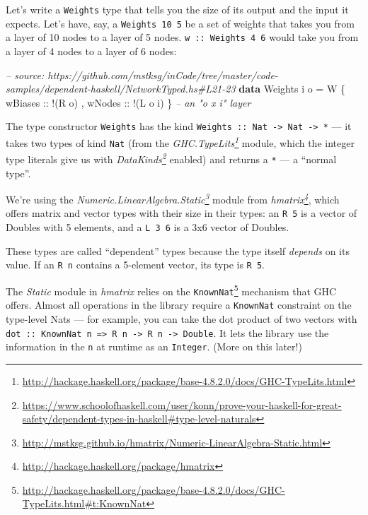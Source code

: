 \documentclass[]{article}
\newenvironment{Shaded}{\begin{snugshade}}{\end{snugshade}}
\newcommand{\CommentTok}[1]{\textcolor[rgb]{0.56,0.35,0.01}{\textit{#1}}}
\newcommand{\DataTypeTok}[1]{\textcolor[rgb]{0.13,0.29,0.53}{#1}}
\newcommand{\FunctionTok}[1]{\textcolor[rgb]{0.00,0.00,0.00}{#1}}
\newcommand{\KeywordTok}[1]{\textcolor[rgb]{0.13,0.29,0.53}{\textbf{#1}}}
\newcommand{\NormalTok}[1]{#1}
\newcommand{\OtherTok}[1]{\textcolor[rgb]{0.56,0.35,0.01}{#1}}
\renewcommand{\href}[2]{#2\footnote{\url{#1}}}
\begin{document}
Let's write a \texttt{Weights} type that tells you the size of its output and
the input it expects. Let's have, say, a \texttt{Weights\ 10\ 5} be a set of
weights that takes you from a layer of 10 nodes to a layer of 5 nodes.
\texttt{w\ ::\ Weights\ 4\ 6} would take you from a layer of 4 nodes to a layer
of 6 nodes:

\begin{Shaded}
\begin{Highlighting}[]
\CommentTok{-- source: https://github.com/mstksg/inCode/tree/master/code-samples/dependent-haskell/NetworkTyped.hs#L21-23}
\KeywordTok{data} \DataTypeTok{Weights}\NormalTok{ i o }\FunctionTok{=} \DataTypeTok{W}\NormalTok{ \{}\OtherTok{ wBiases ::} \FunctionTok{!}\NormalTok{(}\DataTypeTok{R}\NormalTok{ o)}
\NormalTok{                     ,}\OtherTok{ wNodes  ::} \FunctionTok{!}\NormalTok{(}\DataTypeTok{L}\NormalTok{ o i)}
\NormalTok{                     \}                      }\CommentTok{-- an "o x i" layer}
\end{Highlighting}
\end{Shaded}

The type constructor \texttt{Weights} has the kind
\texttt{Weights\ ::\ Nat\ -\textgreater{}\ Nat\ -\textgreater{}\ *} --- it takes
two types of kind \texttt{Nat} (from the
\emph{\href{http://hackage.haskell.org/package/base-4.8.2.0/docs/GHC-TypeLits.html}{GHC.TypeLits}}
module, which the integer type literals give us with
\emph{\href{https://www.schoolofhaskell.com/user/konn/prove-your-haskell-for-great-safety/dependent-types-in-haskell\#type-level-naturals}{DataKinds}}
enabled) and returns a \texttt{*} --- a ``normal type''.

We're using the
\emph{\href{http://mstksg.github.io/hmatrix/Numeric-LinearAlgebra-Static.html}{Numeric.LinearAlgebra.Static}}
module from \emph{\href{http://hackage.haskell.org/package/hmatrix}{hmatrix}},
which offers matrix and vector types with their size in their types: an
\texttt{R\ 5} is a vector of Doubles with 5 elements, and a \texttt{L\ 3\ 6} is
a 3x6 vector of Doubles.

These types are called ``dependent'' types because the type itself
\emph{depends} on its value. If an \texttt{R\ n} contains a 5-element vector,
its type is \texttt{R\ 5}.

The \emph{Static} module in \emph{hmatrix} relies on the
\href{http://hackage.haskell.org/package/base-4.8.2.0/docs/GHC-TypeLits.html\#t:KnownNat}{\texttt{KnownNat}}
mechanism that GHC offers. Almost all operations in the library require a
\texttt{KnownNat} constraint on the type-level Nats --- for example, you can
take the dot product of two vectors with
\texttt{dot\ ::\ KnownNat\ n\ =\textgreater{}\ R\ n\ -\textgreater{}\ R\ n\ -\textgreater{}\ Double}.
It lets the library use the information in the \texttt{n} at runtime as an
\texttt{Integer}. (More on this later!)
\end{document}
